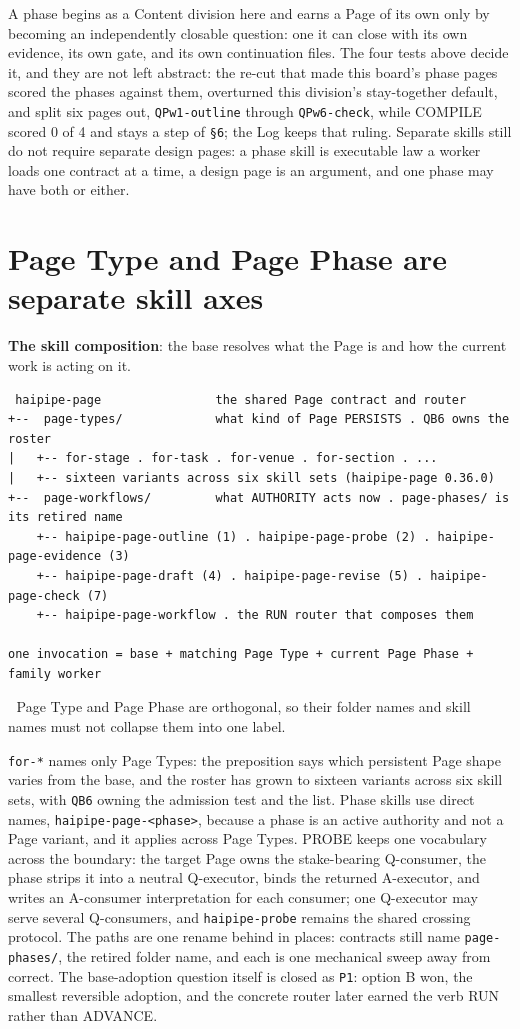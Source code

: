 A phase begins as a Content division here and earns a Page of its own only by becoming an independently closable question: one it can close with its own evidence, its own gate, and its own continuation files. The four tests above decide it, and they are not left abstract: the re-cut that made this board's phase pages scored the phases against them, overturned this division's stay-together default, and split six pages out, \texttt{QPw1-outline} through \texttt{QPw6-check}, while COMPILE scored 0 of 4 and stays a step of \texttt{§6}; the Log keeps that ruling. Separate skills still do not require separate design pages: a phase skill is executable law a worker loads one contract at a time, a design page is an argument, and one phase may have both or either.


\section{Page Type and Page Phase are separate skill axes}
\textbf{The skill composition}: the base resolves what the Page is and how the current work is acting on it.

\begin{verbatim}
 haipipe-page                the shared Page contract and router
+--  page-types/             what kind of Page PERSISTS . QB6 owns the roster
|   +-- for-stage . for-task . for-venue . for-section . ...
|   +-- sixteen variants across six skill sets (haipipe-page 0.36.0)
+--  page-workflows/         what AUTHORITY acts now . page-phases/ is its retired name
    +-- haipipe-page-outline (1) . haipipe-page-probe (2) . haipipe-page-evidence (3)
    +-- haipipe-page-draft (4) . haipipe-page-revise (5) . haipipe-page-check (7)
    +-- haipipe-page-workflow . the RUN router that composes them

one invocation = base + matching Page Type + current Page Phase + family worker
\end{verbatim}
📌 Page Type and Page Phase are orthogonal, so their folder names and skill names must not collapse them into one label.

\texttt{for-*} names only Page Types: the preposition says which persistent Page shape varies from the base, and the roster has grown to sixteen variants across six skill sets, with \texttt{QB6} owning the admission test and the list. Phase skills use direct names, \texttt{haipipe-page-<phase>}, because a phase is an active authority and not a Page variant, and it applies across Page Types. PROBE keeps one vocabulary across the boundary: the target Page owns the stake-bearing Q-consumer, the phase strips it into a neutral Q-executor, binds the returned A-executor, and writes an A-consumer interpretation for each consumer; one Q-executor may serve several Q-consumers, and \texttt{haipipe-probe} remains the shared crossing protocol. The paths are one rename behind in places: contracts still name \texttt{page-phases/}, the retired folder name, and each is one mechanical sweep away from correct. The base-adoption question itself is closed as \texttt{P1}: option B won, the smallest reversible adoption, and the concrete router later earned the verb RUN rather than ADVANCE.


